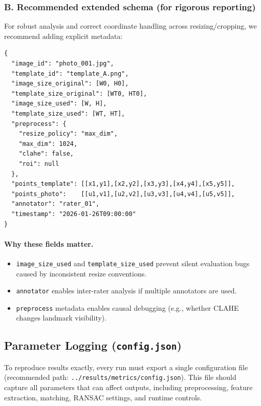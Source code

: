 \subsubsection*{B. Recommended extended schema (for rigorous reporting)}
For robust analysis and correct coordinate handling across resizing/cropping, we recommend adding explicit metadata:

\begin{verbatim}
{
  "image_id": "photo_001.jpg",
  "template_id": "template_A.png",
  "image_size_original": [W0, H0],
  "template_size_original": [WT0, HT0],
  "image_size_used": [W, H],
  "template_size_used": [WT, HT],
  "preprocess": {
    "resize_policy": "max_dim",
    "max_dim": 1024,
    "clahe": false,
    "roi": null
  },
  "points_template": [[x1,y1],[x2,y2],[x3,y3],[x4,y4],[x5,y5]],
  "points_photo":    [[u1,v1],[u2,v2],[u3,v3],[u4,v4],[u5,v5]],
  "annotator": "rater_01",
  "timestamp": "2026-01-26T09:00:00"
}
\end{verbatim}

\paragraph{Why these fields matter.}
\begin{itemize}
  \item \texttt{image\_size\_used} and \texttt{template\_size\_used} prevent silent evaluation bugs caused by inconsistent resize conventions.
  \item \texttt{annotator} enables inter-rater analysis if multiple annotators are used.
  \item \texttt{preprocess} metadata enables causal debugging (e.g., whether CLAHE changes landmark visibility).
\end{itemize}

\subsection{Parameter Logging (\texttt{config.json})}
\label{subsec:appendix_config_logging}

To reproduce results exactly, every run must export a single configuration file (recommended path: \texttt{../results/metrics/config.json}). This file should capture all parameters that can affect outputs, including preprocessing, feature extraction, matching, RANSAC settings, and runtime controls.

